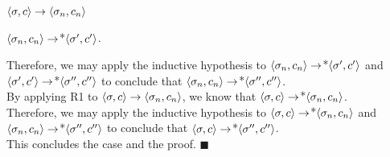\documentclass[11pt]{article}
\begin{document}
\begin{exercise}
\centerline{\( \langle \sigma, c \rangle \rightarrow \langle \sigma_n, c_n \rangle \)}
\centerline{ \( \CONFIG{\sigma_n}{c_n} \stepsone\kleenestar \CONFIG{\sigma'}{c'} \).}

\vspace{3mm}


Therefore, we may apply the inductive hypothesis to \( \CONFIG{\sigma_n}{c_n} \stepsone\kleenestar \CONFIG{\sigma'}{c'} \) and  \( \CONFIG{\sigma'}{c'} \stepsone\kleenestar \CONFIG{\sigma''}{c''} \) to conclude that \( \CONFIG{\sigma_n}{c_n} \stepsone\kleenestar \CONFIG{\sigma''}{c''} \).\\

By applying R1 to \( \langle \sigma, c \rangle \rightarrow \langle \sigma_n, c_n \rangle \), we know that \( \CONFIG{\sigma}{c} \stepsone\kleenestar \CONFIG{\sigma_n}{c_n} \).\\

Therefore, we may apply the inductive hypothesis to  \( \CONFIG{\sigma}{c} \stepsone\kleenestar \CONFIG{\sigma_n}{c_n} \) and \( \CONFIG{\sigma_n}{c_n} \stepsone\kleenestar \CONFIG{\sigma''}{c''} \) to conclude that  \( \CONFIG{\sigma}{c} \stepsone\kleenestar \CONFIG{\sigma''}{c''} \). \checkmark \\

This concludes the case and the proof. $\blacksquare$


\end{exercise}
\end{document}
